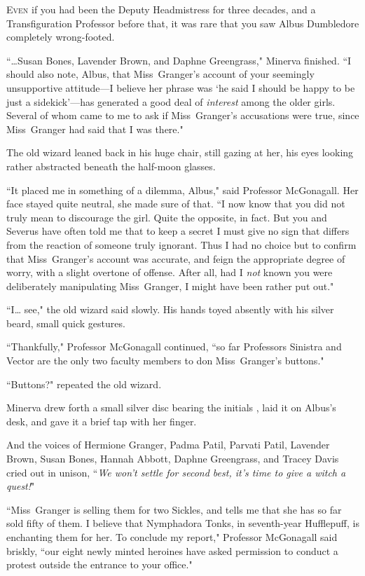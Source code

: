 
\lettrine{E}{ven} if you had been the Deputy Headmistress for three decades, and a Transfiguration Professor before that, it was rare that you saw Albus Dumbledore completely wrong-footed.

``{\ldots}Susan Bones, Lavender Brown, and Daphne Greengrass," Minerva finished. ``I should also note, Albus, that Miss~Granger's account of your seemingly unsupportive attitude—I believe her phrase was `he said I should be happy to be just a sidekick'—has generated a good deal of \emph{interest} among the older girls. Several of whom came to me to ask if Miss~Granger's accusations were true, since Miss~Granger had said that I was there."

The old wizard leaned back in his huge chair, still gazing at her, his eyes looking rather abstracted beneath the half-moon glasses.

``It placed me in something of a dilemma, Albus," said Professor McGonagall. Her face stayed quite neutral, she made sure of that. ``I now know that you did not truly mean to discourage the girl. Quite the opposite, in fact. But you and Severus have often told me that to keep a secret I must give no sign that differs from the reaction of someone truly ignorant. Thus I had no choice but to confirm that Miss~Granger's account was accurate, and feign the appropriate degree of worry, with a slight overtone of offense. After all, had I \emph{not} known you were deliberately manipulating Miss~Granger, I might have been rather put out."

``I{\ldots} see," the old wizard said slowly. His hands toyed absently with his silver beard, small quick gestures.

``Thankfully," Professor McGonagall continued, ``so far Professors Sinistra and Vector are the only two faculty members to don Miss~Granger's buttons."

``Buttons?" repeated the old wizard.

Minerva drew forth a small silver disc bearing the initials \SPHEW, laid it on Albus's desk, and gave it a brief tap with her finger.

And the voices of Hermione Granger, Padma Patil, Parvati Patil, Lavender Brown, Susan Bones, Hannah Abbott, Daphne Greengrass, and Tracey Davis cried out in unison, ``\emph{We won't settle for second best, it's time to give a witch a quest!}"

``Miss~Granger is selling them for two Sickles, and tells me that she has so far sold fifty of them. I believe that Nymphadora Tonks, in seventh-year Hufflepuff, is enchanting them for her. To conclude my report," Professor McGonagall said briskly, ``our eight newly minted heroines have asked permission to conduct a protest outside the entrance to your office."

